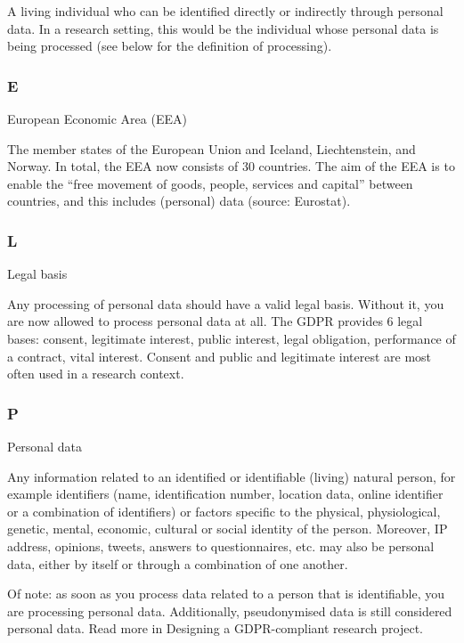 \documentclass[
]{book}
\begin{document}
A living individual who can be identified directly or indirectly through personal data. In a research setting,
this would be the individual whose personal data is being processed (see below for the definition of processing).

\hypertarget{e}{%
\subsubsection{E}\label{e}}

European Economic Area (EEA)

The member states of the European Union and Iceland, Liechtenstein, and Norway. In total, the EEA now consists of
30 countries. The aim of the EEA is to enable the ``free movement of goods, people, services and capital'' between countries,
and this includes (personal) data (source:
Eurostat).

\hypertarget{l}{%
\subsubsection{L}\label{l}}

Legal basis

Any processing of personal data should have a valid legal basis. Without it, you are now allowed to process personal data at all.
The GDPR provides 6 legal bases: consent, legitimate interest, public interest, legal obligation, performance of a contract, vital
interest. Consent and public and legitimate interest are most often used in a research context.

\hypertarget{p}{%
\subsubsection{P}\label{p}}

Personal data

Any information related to an identified or identifiable (living) natural person, for example identifiers (name, identification number,
location data, online identifier or a combination of identifiers) or factors specific to the physical, physiological, genetic, mental,
economic, cultural or social identity of the person. Moreover, IP address, opinions, tweets, answers to questionnaires, etc. may also be
personal data, either by itself or through a combination of one another.

Of note: as soon as you process data related to a person that is identifiable, you are processing personal data. Additionally,
pseudonymised data is still considered personal data. Read more in Designing a GDPR-compliant research project.
\end{document}
